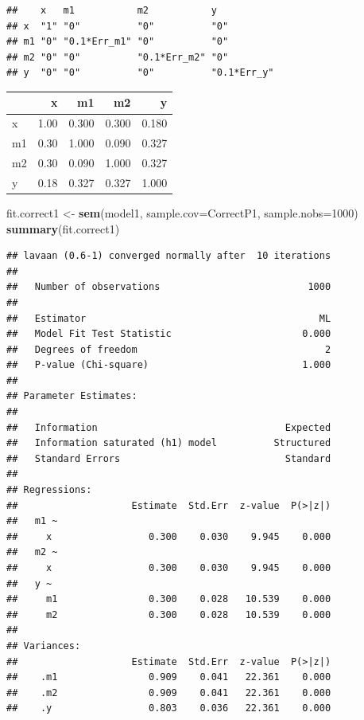 \documentclass[]{article}
\newenvironment{Shaded}{\begin{snugshade}}{\end{snugshade}}
\newcommand{\KeywordTok}[1]{\textcolor[rgb]{0.13,0.29,0.53}{\textbf{#1}}}
\newcommand{\DataTypeTok}[1]{\textcolor[rgb]{0.13,0.29,0.53}{#1}}
\newcommand{\DecValTok}[1]{\textcolor[rgb]{0.00,0.00,0.81}{#1}}
\newcommand{\StringTok}[1]{\textcolor[rgb]{0.31,0.60,0.02}{#1}}
\newcommand{\OperatorTok}[1]{\textcolor[rgb]{0.81,0.36,0.00}{\textbf{#1}}}
\newcommand{\NormalTok}[1]{#1}
\begin{document}
\begin{verbatim}
##    x   m1           m2           y          
## x  "1" "0"          "0"          "0"        
## m1 "0" "0.1*Err_m1" "0"          "0"        
## m2 "0" "0"          "0.1*Err_m2" "0"        
## y  "0" "0"          "0"          "0.1*Err_y"
\end{verbatim}

\begin{Shaded}
\end{Shaded}

\begin{longtable}[]{@{}lrrrr@{}}
\toprule
& x & m1 & m2 & y\tabularnewline
\midrule
\endhead
x & 1.00 & 0.300 & 0.300 & 0.180\tabularnewline
m1 & 0.30 & 1.000 & 0.090 & 0.327\tabularnewline
m2 & 0.30 & 0.090 & 1.000 & 0.327\tabularnewline
y & 0.18 & 0.327 & 0.327 & 1.000\tabularnewline
\bottomrule
\end{longtable}

\begin{Shaded}
\begin{Highlighting}[]
\NormalTok{fit.correct1 <-}\StringTok{ }\KeywordTok{sem}\NormalTok{(model1, }\DataTypeTok{sample.cov=}\NormalTok{CorrectP1, }\DataTypeTok{sample.nobs=}\DecValTok{1000}\NormalTok{)}
\KeywordTok{summary}\NormalTok{(fit.correct1)}
\end{Highlighting}
\end{Shaded}

\begin{verbatim}
## lavaan (0.6-1) converged normally after  10 iterations
## 
##   Number of observations                          1000
## 
##   Estimator                                         ML
##   Model Fit Test Statistic                       0.000
##   Degrees of freedom                                 2
##   P-value (Chi-square)                           1.000
## 
## Parameter Estimates:
## 
##   Information                                 Expected
##   Information saturated (h1) model          Structured
##   Standard Errors                             Standard
## 
## Regressions:
##                    Estimate  Std.Err  z-value  P(>|z|)
##   m1 ~                                                
##     x                 0.300    0.030    9.945    0.000
##   m2 ~                                                
##     x                 0.300    0.030    9.945    0.000
##   y ~                                                 
##     m1                0.300    0.028   10.539    0.000
##     m2                0.300    0.028   10.539    0.000
## 
## Variances:
##                    Estimate  Std.Err  z-value  P(>|z|)
##    .m1                0.909    0.041   22.361    0.000
##    .m2                0.909    0.041   22.361    0.000
##    .y                 0.803    0.036   22.361    0.000
\end{verbatim}
\end{document}

